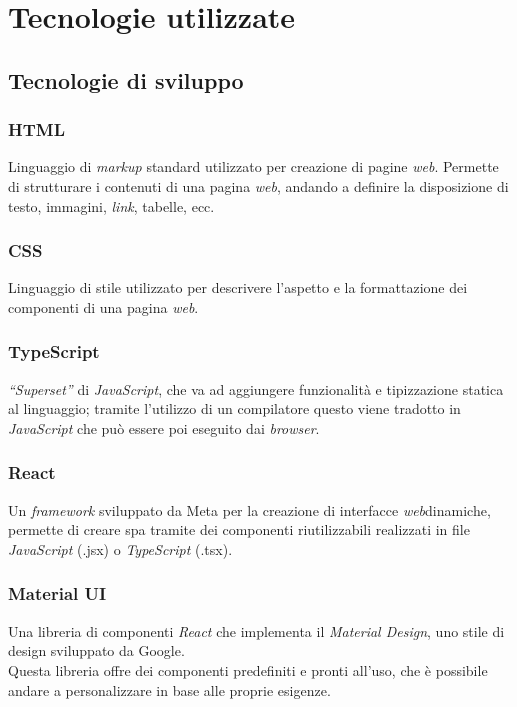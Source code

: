 \pagebreak
\section{Tecnologie utilizzate}
\label{sez:tecnologie-utilizzate}

\subsection{Tecnologie di sviluppo}
\label{sez:tecnologie-sviluppo}

\subsubsection{HTML}

Linguaggio di \textit{markup} standard utilizzato per creazione di pagine \textit{web}.
Permette di strutturare i contenuti di una pagina \textit{web}, andando a definire la disposizione di testo, immagini, \textit{link}, tabelle, ecc.

\subsubsection{CSS}
Linguaggio di stile utilizzato per descrivere l’aspetto e la formattazione dei componenti di una pagina \textit{web}.

\subsubsection{TypeScript}

\textit{“Superset”} di \textit{JavaScript}, che va ad aggiungere funzionalità e tipizzazione statica al linguaggio; 
tramite l’utilizzo di un compilatore questo viene tradotto in \textit{JavaScript} che può essere poi eseguito dai \textit{browser}.

\subsubsection{React}
Un \textit{framework} sviluppato da Meta per la creazione di interfacce \textit{web}dinamiche, permette di creare \gls{spa} tramite dei componenti riutilizzabili realizzati in file \textit{JavaScript} (.jsx) o \textit{TypeScript} (.tsx).

\subsubsection{Material UI}

Una libreria di componenti \textit{React} che implementa il \textit{Material Design}, uno stile di design sviluppato da Google.\\
Questa libreria offre dei componenti predefiniti e pronti all’uso, che è possibile andare a personalizzare in base alle proprie esigenze.

